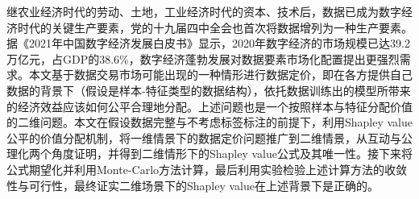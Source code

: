 


\frontmatter
\let\cleardoublepage\clearpage
\begin{abstractcn} %

继农业经济时代的劳动、土地，工业经济时代的资本、技术后，数据已成为数字经济时代的关键生产要素，党的十九届四中全会也首次将数据增列为一种生产要素。据《2021年中国数字经济发展白皮书》显示，2020年数字经济的市场规模已达39.2万亿元，占GDP的38.6\%，数字经济蓬勃发展对数据要素市场化配置提出更强烈需求。本文基于数据交易市场可能出现的一种情形进行数据定价，即在各方提供自己数据的背景下（假设是样本-特征类型的数据结构），依托数据训练出的模型所带来的经济效益应该如何公平合理地分配。上述问题也是一个按照样本与特征分配价值的二维问题。本文在假设数据完整与不考虑标签标注的前提下，利用Shapley value公平的价值分配机制，将一维情景下的数据定价问题推广到二维情景，从互动与公理化两个角度证明，并得到二维情形下的Shapley value公式及其唯一性。接下来将公式期望化并利用Monte-Carlo方法计算，最后利用实验检验上述计算方法的收敛性与可行性，最终证实二维场景下的Shapley value在上述背景下是正确的。


\end{abstractcn}

